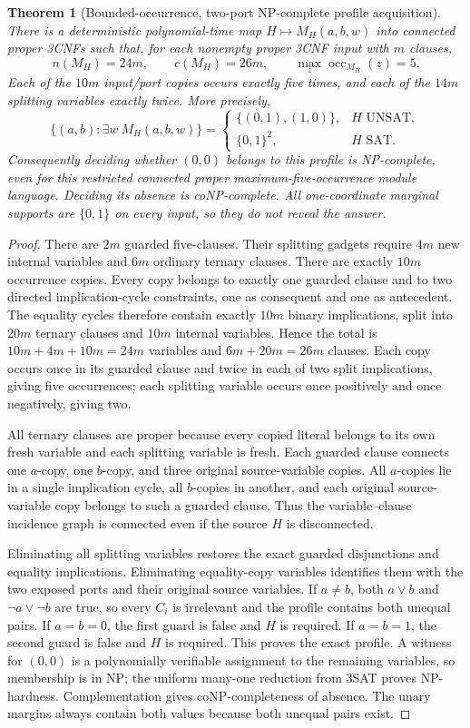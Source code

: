\documentclass[11pt]{article}
\newtheorem{theorem}{Theorem}
\begin{document}
\begin{theorem}[Bounded-occurrence, two-port NP-complete profile acquisition]
There is a deterministic polynomial-time map $H\mapsto M_H(a,b,w)$ into \emph{connected proper 3CNFs} such that, for each nonempty proper 3CNF input with $m$ clauses,
\[
 n(M_H)=24m,\qquad c(M_H)=26m,\qquad \max_z\operatorname{occ}_{M_H}(z)=5.
\]
Each of the $10m$ input/port copies occurs exactly five times, and each of the $14m$ splitting variables exactly twice. More precisely,
\[
 \{(a,b):\exists w\ M_H(a,b,w)\}=
 \begin{cases}
 \{(0,1),(1,0)\},&H\text{ UNSAT},\\
 \{0,1\}^2,&H\text{ SAT}.
 \end{cases}
\]
Consequently deciding whether $(0,0)$ belongs to this profile is NP-complete, even for this restricted connected proper maximum-five-occurrence module language. Deciding its absence is coNP-complete. All one-coordinate marginal supports are $\{0,1\}$ on every input, so they do not reveal the answer.
\end{theorem}
\begin{proof}
There are $2m$ guarded five-clauses. Their splitting gadgets require $4m$ new internal variables and $6m$ ordinary ternary clauses. There are exactly $10m$ occurrence copies. Every copy belongs to exactly one guarded clause and to two directed implication-cycle constraints, one as consequent and one as antecedent. The equality cycles therefore contain exactly $10m$ binary implications, split into $20m$ ternary clauses and $10m$ internal variables. Hence the total is $10m+4m+10m=24m$ variables and $6m+20m=26m$ clauses. Each copy occurs once in its guarded clause and twice in each of two split implications, giving five occurrences; each splitting variable occurs once positively and once negatively, giving two.

All ternary clauses are proper because every copied literal belongs to its own fresh variable and each splitting variable is fresh. Each guarded clause connects one $a$-copy, one $b$-copy, and three original source-variable copies. All $a$-copies lie in a single implication cycle, all $b$-copies in another, and each original source-variable copy belongs to such a guarded clause. Thus the variable--clause incidence graph is connected even if the source $H$ is disconnected.

Eliminating all splitting variables restores the exact guarded disjunctions and equality implications. Eliminating equality-copy variables identifies them with the two exposed ports and their original source variables. If $a\ne b$, both $a\vee b$ and $\neg a\vee\neg b$ are true, so every $C_i$ is irrelevant and the profile contains both unequal pairs. If $a=b=0$, the first guard is false and $H$ is required. If $a=b=1$, the second guard is false and $H$ is required. This proves the exact profile. A witness for $(0,0)$ is a polynomially verifiable assignment to the remaining variables, so membership is in NP; the uniform many-one reduction from 3SAT proves NP-hardness. Complementation gives coNP-completeness of absence. The unary margins always contain both values because both unequal pairs exist.
\end{proof}
\end{document}
